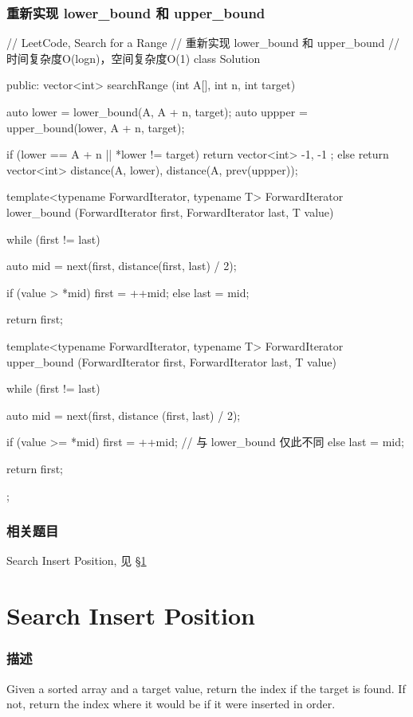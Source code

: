 \subsubsection{重新实现 lower_bound 和 upper_bound}
\begin{Code}
// LeetCode, Search for a Range
// 重新实现 lower_bound 和 upper_bound
// 时间复杂度O(logn)，空间复杂度O(1)
class Solution {
public:
    vector<int> searchRange (int A[], int n, int target) {
        auto lower = lower_bound(A, A + n, target);
        auto uppper = upper_bound(lower, A + n, target);

        if (lower == A + n || *lower != target)
            return vector<int> { -1, -1 };
        else
            return vector<int> {distance(A, lower), distance(A, prev(uppper))};
    }

    template<typename ForwardIterator, typename T>
    ForwardIterator lower_bound (ForwardIterator first,
            ForwardIterator last, T value) {
        while (first != last) {
            auto mid = next(first, distance(first, last) / 2);

            if (value > *mid)   first = ++mid;
            else                last = mid;
        }

        return first;
    }

    template<typename ForwardIterator, typename T>
    ForwardIterator upper_bound (ForwardIterator first,
            ForwardIterator last, T value) {
        while (first != last) {
            auto mid = next(first, distance (first, last) / 2);

            if (value >= *mid)   first = ++mid;  // 与 lower_bound 仅此不同
            else                 last = mid;
        }

        return first;
    }
};
\end{Code}

\subsubsection{相关题目}
\begindot
\item Search Insert Position, 见 \S \ref{sec:search-insert-position}
\myenddot


\section{Search Insert Position} %
\label{sec:search-insert-position}


\subsubsection{描述}
Given a sorted array and a target value, return the index if the target is found. If not, return the index where it would be if it were inserted in order.

